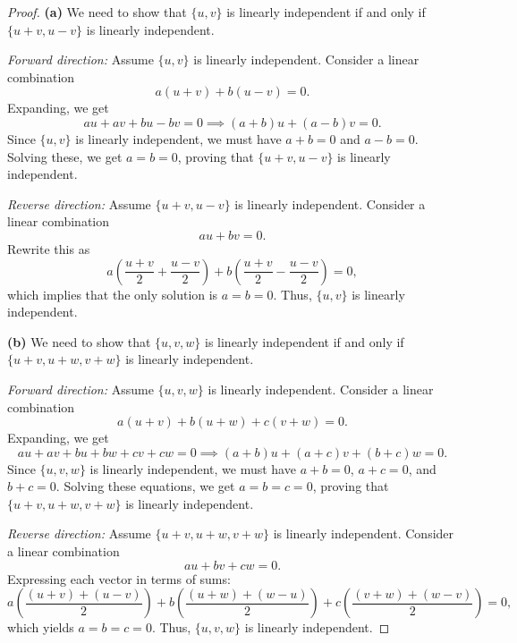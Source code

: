 \documentclass{article}
\theoremstyle{definition}
\begin{document}
\begin{proof}
\textbf{(a)}  
We need to show that \( \{u, v\} \) is linearly independent if and only if \( \{u + v, u - v\} \) is linearly independent.

\textit{Forward direction:}  
Assume \( \{u, v\} \) is linearly independent. Consider a linear combination 
\[
a(u + v) + b(u - v) = 0.
\]
Expanding, we get
\[
a u + a v + b u - b v = 0 \implies (a + b)u + (a - b)v = 0.
\]
Since \( \{u, v\} \) is linearly independent, we must have \( a + b = 0 \) and \( a - b = 0 \). Solving these, we get \( a = b = 0 \), proving that \( \{u + v, u - v\} \) is linearly independent.

\textit{Reverse direction:}  
Assume \( \{u + v, u - v\} \) is linearly independent. Consider a linear combination
\[
a u + b v = 0.
\]
Rewrite this as
\[
a \left(\frac{u + v}{2} + \frac{u - v}{2}\right) + b \left(\frac{u + v}{2} - \frac{u - v}{2}\right) = 0,
\]
which implies that the only solution is \( a = b = 0 \). Thus, \( \{u, v\} \) is linearly independent.

\textbf{(b)}  
We need to show that \( \{u, v, w\} \) is linearly independent if and only if \( \{u + v, u + w, v + w\} \) is linearly independent.

\textit{Forward direction:}  
Assume \( \{u, v, w\} \) is linearly independent. Consider a linear combination 
\[
a(u + v) + b(u + w) + c(v + w) = 0.
\]
Expanding, we get
\[
a u + a v + b u + b w + c v + c w = 0 \implies (a + b)u + (a + c)v + (b + c)w = 0.
\]
Since \( \{u, v, w\} \) is linearly independent, we must have \( a + b = 0 \), \( a + c = 0 \), and \( b + c = 0 \). Solving these equations, we get \( a = b = c = 0 \), proving that \( \{u + v, u + w, v + w\} \) is linearly independent.

\textit{Reverse direction:}  
Assume \( \{u + v, u + w, v + w\} \) is linearly independent. Consider a linear combination
\[
a u + b v + c w = 0.
\]
Expressing each vector in terms of sums:
\[
a \left(\frac{(u + v) + (u - v)}{2}\right) + b \left(\frac{(u + w) + (w - u)}{2}\right) + c \left(\frac{(v + w) + (w - v)}{2}\right) = 0,
\]
which yields \( a = b = c = 0 \). Thus, \( \{u, v, w\} \) is linearly independent.



\end{proof}

\newpage
\end{document}
